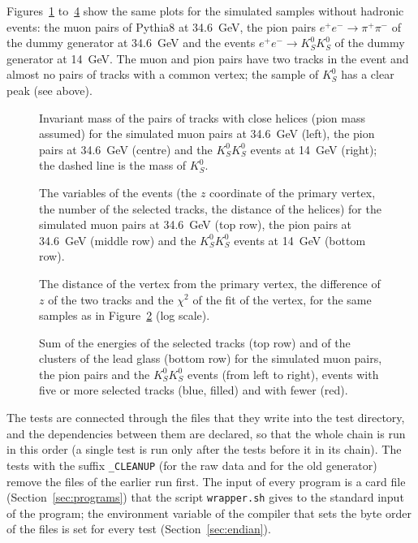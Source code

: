 Figures~\ref{fig:k0slept} to~\ref{fig:k0slenergy} show the same plots for the simulated samples without hadronic events: the muon pairs of Pythia8 at 34.6~GeV, the pion pairs $e^+e^-\to\pi^+\pi^-$ of the dummy generator at 34.6~GeV and the events
$e^+e^-\to K^0_SK^0_S$ of the dummy generator at 14~GeV. The muon and pion pairs have two tracks in the event and almost no pairs of tracks with a common vertex; the sample of $K^0_S$ has a clear peak (see above).
\begin{figure}[H]
\centering
{}
\caption{Invariant mass of the pairs of tracks with close helices (pion mass assumed) for the simulated muon pairs at 34.6~GeV (left), the pion pairs at 34.6~GeV (centre) and the $K^0_SK^0_S$ events at 14~GeV (right); the dashed line is the mass of $K^0_S$.}
\label{fig:k0slept}
\end{figure}
\begin{figure}[H]
\centering
{}
\caption{The variables of the events (the $z$ coordinate of the primary vertex, the number of the selected tracks, the distance of the helices) for the simulated muon pairs at 34.6~GeV (top row), the pion pairs at 34.6~GeV (middle row) and the $K^0_SK^0_S$ events at 14~GeV (bottom row).}
\label{fig:k0slevent}
\end{figure}
\begin{figure}[H]
\centering
{}
\caption{The distance of the vertex from the primary vertex, the difference of $z$ of the two tracks and the $\chi^2$ of the fit of the vertex, for the same samples as in Figure~\ref{fig:k0slevent} (log scale).}
\label{fig:k0slcuts}
\end{figure}
\begin{figure}[H]
\centering
{}
\caption{Sum of the energies of the selected tracks (top row) and of the clusters of the lead glass (bottom row) for the simulated muon pairs, the pion pairs and the $K^0_SK^0_S$ events (from left to right), events with five or more selected tracks (blue, filled) and with fewer (red).}
\label{fig:k0slenergy}
\end{figure}
\FloatBarrier

The tests are connected through the files that they write into the test directory, and the dependencies between them are declared, so that the whole chain is run
in this order (a single test is run only after the tests before it in its chain). The tests with the suffix \texttt{\_CLEANUP} (for the raw data and for the old generator) remove the files of the earlier run first. The input of every program is a card
file (Section~\ref{sec:programs}) that the script \texttt{wrapper.sh} gives to the standard input of the program; the environment variable of the compiler
that sets the byte order of the files is set for every test (Section~\ref{sec:endian}).

